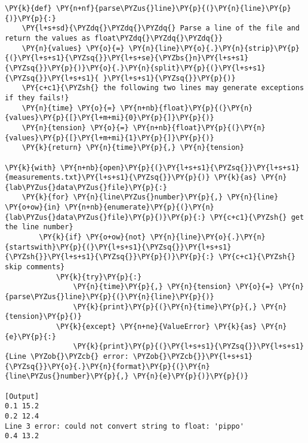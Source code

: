 \begin{Verbatim}[label=\makebox{\url{https://github.com/lucabaldini/cmepda/tree/master/slides/latex/snippets/when\_to\_catch\_2.py}},commandchars=\\\{\}]
\PY{k}{def} \PY{n+nf}{parse\PYZus{}line}\PY{p}{(}\PY{n}{line}\PY{p}{)}\PY{p}{:}
    \PY{l+s+sd}{\PYZdq{}\PYZdq{}\PYZdq{} Parse a line of the file and return the values as float\PYZdq{}\PYZdq{}\PYZdq{}}
    \PY{n}{values} \PY{o}{=} \PY{n}{line}\PY{o}{.}\PY{n}{strip}\PY{p}{(}\PY{l+s+s1}{\PYZsq{}}\PY{l+s+se}{\PYZbs{}n}\PY{l+s+s1}{\PYZsq{}}\PY{p}{)}\PY{o}{.}\PY{n}{split}\PY{p}{(}\PY{l+s+s1}{\PYZsq{}}\PY{l+s+s1}{ }\PY{l+s+s1}{\PYZsq{}}\PY{p}{)}
    \PY{c+c1}{\PYZsh{} the following two lines may generate exceptions if they fails!}
    \PY{n}{time} \PY{o}{=} \PY{n+nb}{float}\PY{p}{(}\PY{n}{values}\PY{p}{[}\PY{l+m+mi}{0}\PY{p}{]}\PY{p}{)}
    \PY{n}{tension} \PY{o}{=} \PY{n+nb}{float}\PY{p}{(}\PY{n}{values}\PY{p}{[}\PY{l+m+mi}{1}\PY{p}{]}\PY{p}{)}
    \PY{k}{return} \PY{n}{time}\PY{p}{,} \PY{n}{tension}

\PY{k}{with} \PY{n+nb}{open}\PY{p}{(}\PY{l+s+s1}{\PYZsq{}}\PY{l+s+s1}{measurements.txt}\PY{l+s+s1}{\PYZsq{}}\PY{p}{)} \PY{k}{as} \PY{n}{lab\PYZus{}data\PYZus{}file}\PY{p}{:}
    \PY{k}{for} \PY{n}{line\PYZus{}number}\PY{p}{,} \PY{n}{line} \PY{o+ow}{in} \PY{n+nb}{enumerate}\PY{p}{(}\PY{n}{lab\PYZus{}data\PYZus{}file}\PY{p}{)}\PY{p}{:} \PY{c+c1}{\PYZsh{} get the line number}
        \PY{k}{if} \PY{o+ow}{not} \PY{n}{line}\PY{o}{.}\PY{n}{startswith}\PY{p}{(}\PY{l+s+s1}{\PYZsq{}}\PY{l+s+s1}{\PYZsh{}}\PY{l+s+s1}{\PYZsq{}}\PY{p}{)}\PY{p}{:} \PY{c+c1}{\PYZsh{} skip comments}
            \PY{k}{try}\PY{p}{:}
                \PY{n}{time}\PY{p}{,} \PY{n}{tension} \PY{o}{=} \PY{n}{parse\PYZus{}line}\PY{p}{(}\PY{n}{line}\PY{p}{)}
                \PY{k}{print}\PY{p}{(}\PY{n}{time}\PY{p}{,} \PY{n}{tension}\PY{p}{)}
            \PY{k}{except} \PY{n+ne}{ValueError} \PY{k}{as} \PY{n}{e}\PY{p}{:}
                \PY{k}{print}\PY{p}{(}\PY{l+s+s1}{\PYZsq{}}\PY{l+s+s1}{Line \PYZob{}\PYZcb{} error: \PYZob{}\PYZcb{}}\PY{l+s+s1}{\PYZsq{}}\PY{o}{.}\PY{n}{format}\PY{p}{(}\PY{n}{line\PYZus{}number}\PY{p}{,} \PY{n}{e}\PY{p}{)}\PY{p}{)}

[Output]
0.1 15.2
0.2 12.4
Line 3 error: could not convert string to float: 'pippo'
0.4 13.2
\end{Verbatim}